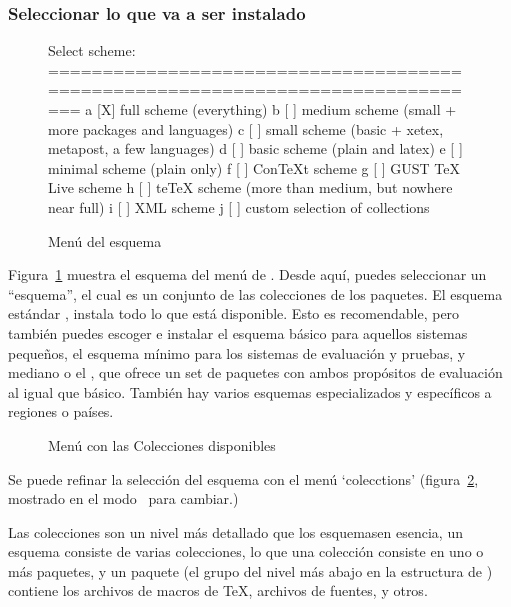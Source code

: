 \documentclass{article}
\begin{document}
\subsubsection{Seleccionar lo que va a ser instalado}
\label{sec:components}

\begin{figure}[tbh]
\begin{boxedverbatim}
Select scheme:
===============================================================================
 a [X] full scheme (everything)
 b [ ] medium scheme (small + more packages and languages)
 c [ ] small scheme (basic + xetex, metapost, a few languages)
 d [ ] basic scheme (plain and latex)
 e [ ] minimal scheme (plain only)
 f [ ] ConTeXt scheme
 g [ ] GUST TeX Live scheme
 h [ ] teTeX scheme (more than medium, but nowhere near full)
 i [ ] XML scheme
 j [ ] custom selection of collections
\end{boxedverbatim}
\caption{Menú del esquema}\label{fig:scheme-text}
\end{figure}

Figura~\ref{fig:scheme-text} muestra el esquema del menú de \TL. Desde
aquí, puedes seleccionar un ``esquema'', el cual es un conjunto de las
colecciones de los paquetes. El esquema estándar ,
instala todo lo que está disponible. Esto es recomendable, pero
también puedes escoger e instalar el esquema básico 
para aquellos sistemas pequeños, el esquema mínimo 
para los sistemas de evaluación y pruebas, y mediano  o
el , que ofrece un set de paquetes con ambos propósitos
de evaluación al igual que básico. También hay varios esquemas
especializados y específicos a regiones o países.

\begin{figure}[tb]
\centering {}
\caption{Menú con las Colecciones disponibles}\label{fig:collections-gui}
\end{figure}

Se puede refinar la selección del esquema con el menú `colecctions'
(figura~\ref{fig:collections-gui}, mostrado en el modo \GUI\, para
cambiar.)

Las colecciones son un nivel más detallado que los esquemas\Dash en
esencia, un esquema consiste de varias colecciones, lo que una colección
consiste en uno o más paquetes, y un paquete (el grupo del nivel más
abajo en la estructura de \TL) contiene los archivos de macros de
\TeX{}, archivos de fuentes, y otros.
\end{document}
